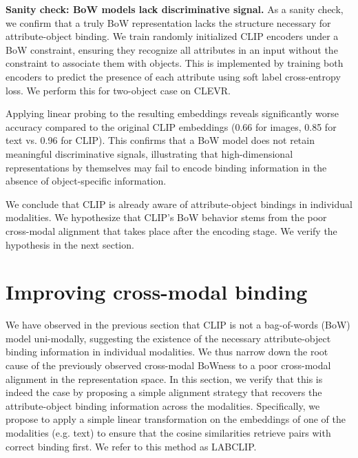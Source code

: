 \noindent
\textbf{Sanity check: BoW models lack discriminative signal.} As a sanity check, we confirm that a truly BoW representation lacks the structure necessary for attribute-object binding. We train randomly initialized CLIP encoders under a BoW constraint, ensuring they recognize all attributes in an input without the constraint to associate them with objects. This is implemented by training both encoders to predict the presence of each attribute using soft label cross-entropy loss. We perform this for two-object case on CLEVR.

Applying linear probing to the resulting embeddings reveals significantly worse accuracy compared to the original CLIP embeddings (0.66 for images, 0.85 for text vs. 0.96 for CLIP). This confirms that a BoW model does not retain meaningful discriminative signals, illustrating that high-dimensional representations by themselves may fail to encode binding information in the absence of object-specific information.





We conclude that CLIP is already aware of attribute-object bindings in individual modalities.
We hypothesize that CLIP's BoW behavior \cite{Tang2023, Lewis2024} stems from the poor cross-modal alignment that takes place after the encoding stage. We verify the hypothesis in the next section.































\section{Improving cross-modal binding}
\label{sec:cross_modal_binding}

We have observed in the previous section that CLIP is not a bag-of-words (BoW) model uni-modally, suggesting the existence of the necessary attribute-object binding information in individual modalities. We thus narrow down the root cause of the previously observed cross-modal BoWness to a poor cross-modal alignment in the representation space. In this section, we verify that this is indeed the case by proposing a simple alignment strategy that recovers the attribute-object binding information across the modalities. Specifically, we propose to apply a simple linear transformation on the embeddings of one of the modalities (e.g. text) to ensure that the cosine similarities retrieve pairs with correct binding first. We refer to this method as LABCLIP.

